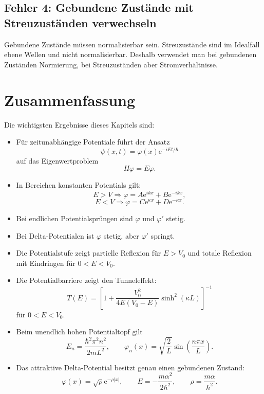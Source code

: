 \subsection{Fehler 4: Gebundene Zustände mit Streuzuständen verwechseln}

Gebundene Zustände müssen normalisierbar sein. Streuzustände sind im Idealfall ebene Wellen und nicht normalisierbar. Deshalb verwendet man bei gebundenen Zuständen Normierung, bei Streuzuständen aber Stromverhältnisse.

\section{Zusammenfassung}

\begin{conceptbox}
Die wichtigsten Ergebnisse dieses Kapitels sind:
\begin{itemize}
    \item Für zeitunabhängige Potentiale führt der Ansatz
    \[
        \psi(x,t)=\varphi(x)\mathrm{e}^{-iEt/\hbar}
    \]
    auf das Eigenwertproblem
    \[
        H\varphi=E\varphi.
    \]

    \item In Bereichen konstanten Potentials gilt:
    \[
        E>V \Rightarrow \varphi=A\mathrm{e}^{ikx}+B\mathrm{e}^{-ikx},
    \]
    \[
        E<V \Rightarrow \varphi=C\mathrm{e}^{\kappa x}+D\mathrm{e}^{-\kappa x}.
    \]

    \item Bei endlichen Potentialsprüngen sind $\varphi$ und $\varphi'$ stetig.

    \item Bei Delta-Potentialen ist $\varphi$ stetig, aber $\varphi'$ springt.

    \item Die Potentialstufe zeigt partielle Reflexion für $E>V_0$ und totale Reflexion mit Eindringen für $0<E<V_0$.

    \item Die Potentialbarriere zeigt den Tunneleffekt:
    \[
        T(E)=\left[1+\frac{V_0^2}{4E(V_0-E)}\sinh^2(\kappa L)\right]^{-1}
    \]
    für $0<E<V_0$.

    \item Beim unendlich hohen Potentialtopf gilt
    \[
        E_n=\frac{\hbar^2\pi^2n^2}{2mL^2},
        \qquad
        \varphi_n(x)=\sqrt{\frac{2}{L}}\sin\left(\frac{n\pi x}{L}\right).
    \]

    \item Das attraktive Delta-Potential besitzt genau einen gebundenen Zustand:
    \[
        \varphi(x)=\sqrt{\rho}\mathrm{e}^{-\rho|x|},
        \qquad
        E=-\frac{m\alpha^2}{2\hbar^2},
        \qquad
        \rho=\frac{m\alpha}{\hbar^2}.
    \]
\end{itemize}
\end{conceptbox}
